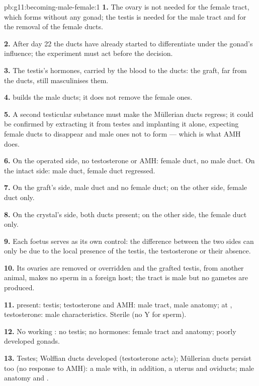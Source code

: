 \begin{solution}{pb:g11:becoming-male-female:1}
\textbf{1.} The ovary is not needed for the female tract, which forms
without any gonad; the testis is needed for the male tract and for the
removal of the female ducts.

\textbf{2.} After day 22 the ducts have already started to
differentiate under the gonad's influence; the experiment must act
before the decision.

\textbf{3.} The testis's hormones, carried by the blood to the ducts:
the graft, far from the ducts, still masculinises them.

\textbf{4.}  builds the male ducts; it does not remove the
female ones.

\textbf{5.} A second testicular substance must make the Müllerian
ducts regress; it could be confirmed by extracting it from testes and
implanting it alone, expecting female ducts to disappear and male ones
not to form --- which is what AMH does.

\textbf{6.} On the operated side, no testosterone or AMH: female duct,
no male duct. On the intact side: male duct, female duct regressed.

\textbf{7.} On the graft's side, male duct and no female duct; on the
other side, female duct only.

\textbf{8.} On the crystal's side, both ducts present; on the other
side, the female duct only.

\textbf{9.} Each foetus serves as its own control: the difference
between the two sides can only be due to the local presence of the
testis, the testosterone or their absence.

\textbf{10.} Its ovaries are removed or overridden and the grafted
testis, from another animal, makes no sperm in a foreign host; the
tract is male but no gametes are produced.

\textbf{11.}  present: testis; testosterone and AMH: male tract,
male anatomy; at , testosterone: male characteristics. Sterile
(no Y  for sperm).

\textbf{12.} No working : no testis; no hormones: female tract and
anatomy; poorly developed gonads.

\textbf{13.} Testes; Wolffian ducts developed (testosterone acts);
Müllerian ducts persist too (no response to AMH): a male with, in
addition, a uterus and oviducts; male anatomy and .


\end{solution}
